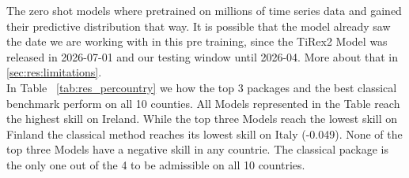 %
The zero shot models where pretrained on millions of time series data and gained their predictive distribution that way. It is possible that the model already saw the date we are working with in this pre training, since the TiRex2 Model was released in 2026-07-01 and our testing window until 2026-04. More about that in \cref{sec:res:limitations}.\\
In Table ~\ref{tab:res_percountry} we how the top 3 packages and the best classical benchmark perform on all 10 counties. All Models represented in the Table reach the highest skill on Ireland. While the top three Models reach the lowest skill on Finland the classical method reaches its lowest skill on Italy (-0.049). None of the top three Models have a negative skill in any countrie. The classical package is the only one out of the 4 to be admissible on all 10 countries. 

